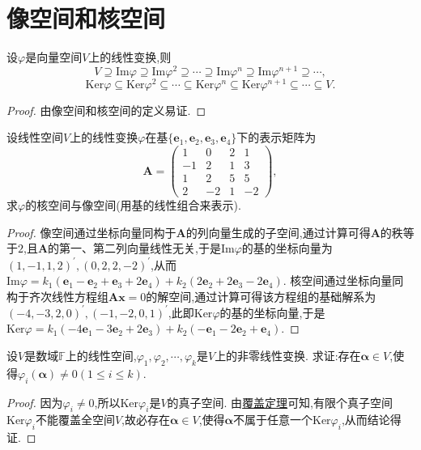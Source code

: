 \documentclass[../../main.tex]{subfiles}%
\begin{document}
\section{像空间和核空间}

\begin{proposition}\label{proposition:像空间和核空间的子空间链}
设\(\varphi\)是向量空间\(V\)上的线性变换,则
\[
V\supseteq \mathrm{Im}\varphi \supseteq \mathrm{Im}\varphi^2 \supseteq \cdots \supseteq \mathrm{Im}\varphi^n \supseteq \mathrm{Im}\varphi^{n + 1} \supseteq \cdots,
\]
\[
\mathrm{Ker}\varphi \subseteq \mathrm{Ker}\varphi ^2\subseteq \cdots \subseteq \mathrm{Ker}\varphi ^n\subseteq \mathrm{Ker}\varphi ^{n+1}\subseteq \cdots \subseteq V.
\]
\end{proposition}
\begin{proof}
由像空间和核空间的定义易证.
\end{proof}

\begin{example}
设线性空间\(V\)上的线性变换\(\varphi\)在基\(\{\boldsymbol{e}_1,\boldsymbol{e}_2,\boldsymbol{e}_3,\boldsymbol{e}_4\}\)下的表示矩阵为
\[
\boldsymbol{A}=\begin{pmatrix}
1&0&2&1\\
-1&2&1&3\\
1&2&5&5\\
2&-2&1&-2
\end{pmatrix},
\]
求\(\varphi\)的核空间与像空间(用基的线性组合来表示).
\end{example}
\begin{proof}
像空间通过坐标向量同构于\(\boldsymbol{A}\)的列向量生成的子空间,通过计算可得\(\boldsymbol{A}\)的秩等于\(2\),且\(\boldsymbol{A}\)的第一、第二列向量线性无关,于是\(\text{Im}\varphi\)的基的坐标向量为\((1,-1,1,2)^\prime,(0,2,2,-2)^\prime\),从而\(\text{Im}\varphi = k_1(\boldsymbol{e}_1 - \boldsymbol{e}_2 + \boldsymbol{e}_3 + 2\boldsymbol{e}_4)+k_2(2\boldsymbol{e}_2 + 2\boldsymbol{e}_3 - 2\boldsymbol{e}_4)\). 核空间通过坐标向量同构于齐次线性方程组\(\boldsymbol{A}\boldsymbol{x}=0\)的解空间,通过计算可得该方程组的基础解系为\((-4,-3,2,0)^\prime,(-1,-2,0,1)^\prime\),此即\(\text{Ker}\varphi\)的基的坐标向量,于是\(\text{Ker}\varphi = k_1(-4\boldsymbol{e}_1 - 3\boldsymbol{e}_2 + 2\boldsymbol{e}_3)+k_2(-\boldsymbol{e}_1 - 2\boldsymbol{e}_2 + \boldsymbol{e}_4)\).
\end{proof}

\begin{proposition}\label{proposition:一组有限个非零线性变换一定存在非零像}
设\(V\)是数域\(\mathbb{F}\)上的线性空间,\(\varphi_1,\varphi_2,\cdots,\varphi_k\)是\(V\)上的非零线性变换. 求证:存在\(\boldsymbol{\alpha}\in V\),使得\(\varphi_i(\boldsymbol{\alpha})\neq 0(1\leqslant  i\leqslant  k)\).
\end{proposition}
\begin{proof}
因为\(\varphi_i\neq 0\),所以\(\text{Ker}\varphi_i\)是\(V\)的真子空间. 由\hyperref[theorem:覆盖定理]{覆盖定理}可知,有限个真子空间\(\text{Ker}\varphi_i\)不能覆盖全空间\(V\),故必存在\(\boldsymbol{\alpha}\in V\),使得\(\boldsymbol{\alpha}\)不属于任意一个\(\text{Ker}\varphi_i\),从而结论得证.
\end{proof}
\end{document}
